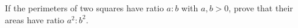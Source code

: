 If the perimeters of two squares have ratio $a:b$ with $a,b>0$, prove that their areas have ratio $a^2:b^2$.
